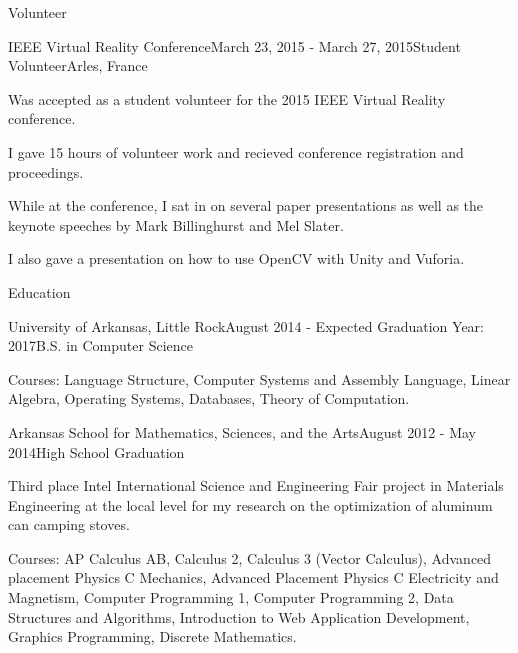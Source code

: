 \documentclass{resume} %
\begin{document}
\begin{rSection}{Volunteer}

	\begin{rSubsection}{IEEE Virtual Reality Conference}{March 23, 2015 - March 27, 2015}{Student Volunteer}{Arles, France}

		\item Was accepted as a student volunteer for the 2015 IEEE Virtual Reality conference.
		\item I gave 15 hours of volunteer work and recieved conference registration and proceedings.
		\item While at the conference, I sat in on several paper presentations as well as the keynote speeches by Mark Billinghurst and Mel Slater.
		\item I also gave a presentation on how to use OpenCV with Unity and Vuforia.
	\end{rSubsection}

\end{rSection}


\begin{rSection}{Education}

\begin{rSubsection}{University of Arkansas, Little Rock}{August 2014 - Expected Graduation Year: 2017}{B.S. in Computer Science}

	\item Courses: Language Structure, Computer Systems and Assembly Language, Linear Algebra, Operating Systems, Databases, Theory of Computation.
\end{rSubsection}

\begin{rSubsection}{Arkansas School for Mathematics, Sciences, and the Arts}{August 2012 - May 2014}{High School Graduation}

	\item Third place Intel International Science and Engineering Fair project in Materials Engineering at the local level for my research on the optimization of aluminum can camping stoves.
	\item Courses: AP Calculus AB, Calculus 2, Calculus 3 (Vector Calculus), Advanced placement Physics C Mechanics, Advanced Placement Physics C Electricity and Magnetism, Computer Programming 1, Computer Programming 2, Data Structures and Algorithms, Introduction to Web Application Development, Graphics Programming, Discrete Mathematics.
\end{rSubsection}

\end{rSection}
\end{document}
